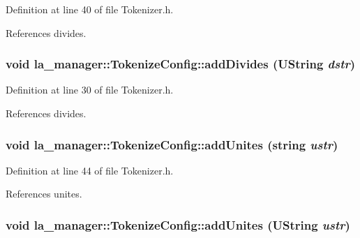 Definition at line 40 of file Tokenizer.h.

References divides.\hypertarget{classla__manager_1_1TokenizeConfig_9b5b2d544b9d1a685620029ba992b86c}{
\subsubsection[{addDivides}]{\setlength{\rightskip}{0pt plus 5cm}void la\_\-manager::TokenizeConfig::addDivides (UString {\em dstr})}}
\label{classla__manager_1_1TokenizeConfig_9b5b2d544b9d1a685620029ba992b86c}




Definition at line 30 of file Tokenizer.h.

References divides.\hypertarget{classla__manager_1_1TokenizeConfig_3a7d5eebb763ea06b1949361a9b38eaf}{
\subsubsection[{addUnites}]{\setlength{\rightskip}{0pt plus 5cm}void la\_\-manager::TokenizeConfig::addUnites (string {\em ustr})}}
\label{classla__manager_1_1TokenizeConfig_3a7d5eebb763ea06b1949361a9b38eaf}




Definition at line 44 of file Tokenizer.h.

References unites.\hypertarget{classla__manager_1_1TokenizeConfig_7c8ee4325792c8ba91c2b3572794b5f1}{
\subsubsection[{addUnites}]{\setlength{\rightskip}{0pt plus 5cm}void la\_\-manager::TokenizeConfig::addUnites (UString {\em ustr})}}
\label{classla__manager_1_1TokenizeConfig_7c8ee4325792c8ba91c2b3572794b5f1}




